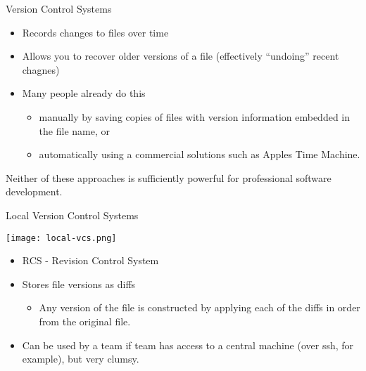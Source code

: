 \documentclass{beamer}
\author[Chris Simpkins] 
{Christopher Simpkins \\\texttt{chris.simpkins@gatech.edu}}
\institute[Georgia Tech] %
\date[CS 1331]{}
\begin{document}
\begin{frame}
  \titlepage
\end{frame}


\begin{frame}[fragile]{Version Control Systems}

\begin{itemize}
\item Records changes to files over time
\item Allows you to recover older versions of a file (effectively ``undoing'' recent chagnes)
\item Many people already do this
\begin{itemize}
\item manually by saving copies of files with version information embedded in the file name, or
\item automatically using a commercial solutions such as Apples Time Machine.
\end{itemize}
\end{itemize}

Neither of these approaches is sufficiently powerful for professional software development.

\end{frame}

\begin{frame}[fragile]{Local Version Control Systems}

\begin{center}
\texttt{[image: local-vcs.png]}
\end{center}

\begin{itemize}
\item RCS - Revision Control System
\item Stores file versions as diffs
\begin{itemize}
\item Any version of the file is constructed by applying each of the diffs in order from the original file.
\end{itemize}
\item Can be used by a team if team has access to a central machine (over ssh, for example), but very clumsy.
\end{itemize}


\end{frame}
\end{document}
